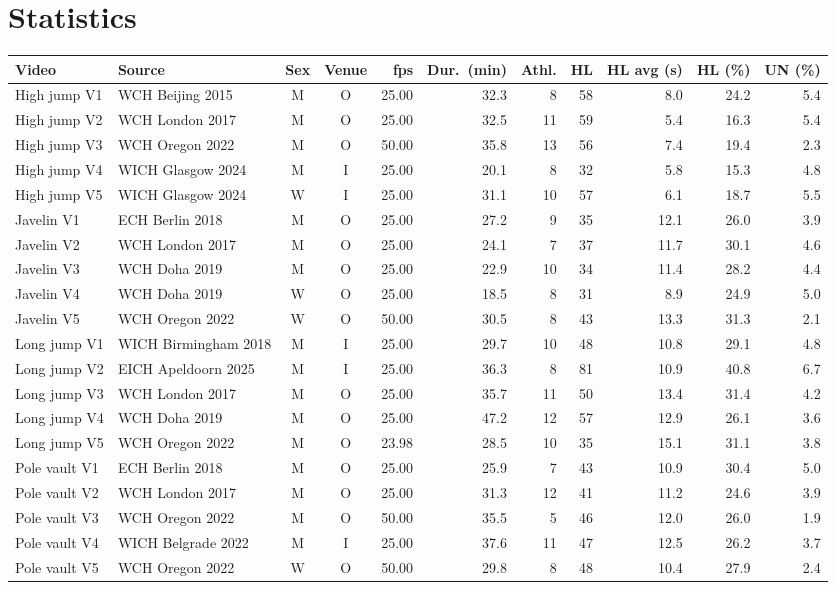 \documentclass[11pt,a4paper]{article}
\begin{document}
\section*{Statistics}
\begin{center}\small\setlength{\tabcolsep}{3pt}
\begin{tabular}{@{}l l c c r r r r r r r@{}}
\toprule
Video & Source & Sex & Venue & fps & Dur.\ (min) & Athl. & HL & HL avg (s) & HL (\%) & UN (\%)\\
\midrule
{High jump V1} & WCH Beijing 2015 & M & O & 25.00 & 32.3 & 8 & 58 & 8.0 & 24.2 & 5.4\\
{High jump V2} & WCH London 2017 & M & O & 25.00 & 32.5 & 11 & 59 & 5.4 & 16.3 & 5.4\\
{High jump V3} & WCH Oregon 2022 & M & O & 50.00 & 35.8 & 13 & 56 & 7.4 & 19.4 & 2.3\\
{High jump V4} & WICH Glasgow 2024 & M & I & 25.00 & 20.1 & 8 & 32 & 5.8 & 15.3 & 4.8\\
{High jump V5} & WICH Glasgow 2024 & W & I & 25.00 & 31.1 & 10 & 57 & 6.1 & 18.7 & 5.5\\
\addlinespace
{Javelin V1} & ECH Berlin 2018 & M & O & 25.00 & 27.2 & 9 & 35 & 12.1 & 26.0 & 3.9\\
{Javelin V2} & WCH London 2017 & M & O & 25.00 & 24.1 & 7 & 37 & 11.7 & 30.1 & 4.6\\
{Javelin V3} & WCH Doha 2019 & M & O & 25.00 & 22.9 & 10 & 34 & 11.4 & 28.2 & 4.4\\
{Javelin V4} & WCH Doha 2019 & W & O & 25.00 & 18.5 & 8 & 31 & 8.9 & 24.9 & 5.0\\
{Javelin V5} & WCH Oregon 2022 & W & O & 50.00 & 30.5 & 8 & 43 & 13.3 & 31.3 & 2.1\\
\addlinespace
{Long jump V1} & WICH Birmingham 2018 & M & I & 25.00 & 29.7 & 10 & 48 & 10.8 & 29.1 & 4.8\\
{Long jump V2} & EICH Apeldoorn 2025 & M & I & 25.00 & 36.3 & 8 & 81 & 10.9 & 40.8 & 6.7\\
{Long jump V3} & WCH London 2017 & M & O & 25.00 & 35.7 & 11 & 50 & 13.4 & 31.4 & 4.2\\
{Long jump V4} & WCH Doha 2019 & M & O & 25.00 & 47.2 & 12 & 57 & 12.9 & 26.1 & 3.6\\
{Long jump V5} & WCH Oregon 2022 & M & O & 23.98 & 28.5 & 10 & 35 & 15.1 & 31.1 & 3.8\\
\addlinespace
{Pole vault V1} & ECH Berlin 2018 & M & O & 25.00 & 25.9 & 7 & 43 & 10.9 & 30.4 & 5.0\\
{Pole vault V2} & WCH London 2017 & M & O & 25.00 & 31.3 & 12 & 41 & 11.2 & 24.6 & 3.9\\
{Pole vault V3} & WCH Oregon 2022 & M & O & 50.00 & 35.5 & 5 & 46 & 12.0 & 26.0 & 1.9\\
{Pole vault V4} & WICH Belgrade 2022 & M & I & 25.00 & 37.6 & 11 & 47 & 12.5 & 26.2 & 3.7\\
{Pole vault V5} & WCH Oregon 2022 & W & O & 50.00 & 29.8 & 8 & 48 & 10.4 & 27.9 & 2.4\\
\bottomrule
\end{tabular}\end{center}
\end{document}
